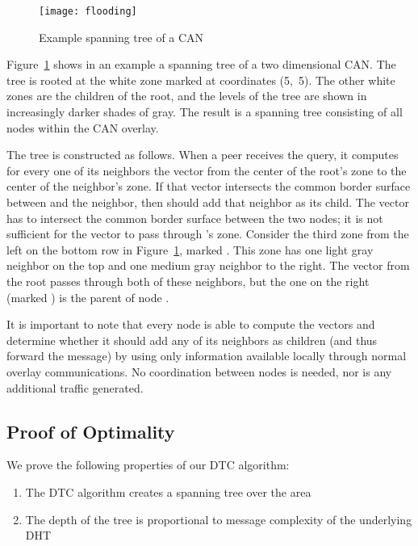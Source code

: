 \documentclass[fleqn,12pt,twoside]{article}
\begin{document}
\begin{figure}[!tb]
  \centering
  \texttt{[image: flooding]}
  \caption{Example spanning tree of a CAN}
  \label{fig:flooding}
  \vskip -5mm
\end{figure}

Figure~\ref{fig:flooding} shows in an example a spanning tree of a two dimensional CAN. 
The tree is rooted at the white zone marked  at coordinates (5,~5). The other white zones are
the children of the root, and the levels of the tree are shown in
increasingly darker shades of gray. The result is a spanning tree
consisting of all nodes within the CAN overlay.

The tree is constructed as follows.  When a peer  receives the
query, it computes for every one of its neighbors the vector from the
center of the root's zone to the center of the neighbor's zone. If
that vector intersects the common border surface between  and the
neighbor, then  should add that neighbor as its child. The vector
has to intersect the common border surface between the two nodes; it
is not sufficient for the vector to pass through 's zone. Consider
the third zone from the left on the bottom row in
Figure~\ref{fig:flooding}, marked . This zone has one light gray
neighbor  on the top and one medium gray  neighbor to the right.
The vector from the root passes through both of these neighbors, but
the one on the right (marked ) is the parent of node .

It is important to note that every node is able to compute the vectors
and determine whether it should add any of its neighbors as children
(and thus forward the message) by using only information available
locally through normal overlay communications.  No coordination
between nodes is needed, nor is any additional traffic generated.


\subsection{Proof of Optimality}
\label{sec:proof-optimality}

We prove the following properties of our DTC algorithm:
\begin{enumerate}

\item The DTC algorithm creates a spanning tree over the area
\item The depth of the tree is proportional to message complexity of the
  underlying DHT
\end{enumerate}
\end{document}
